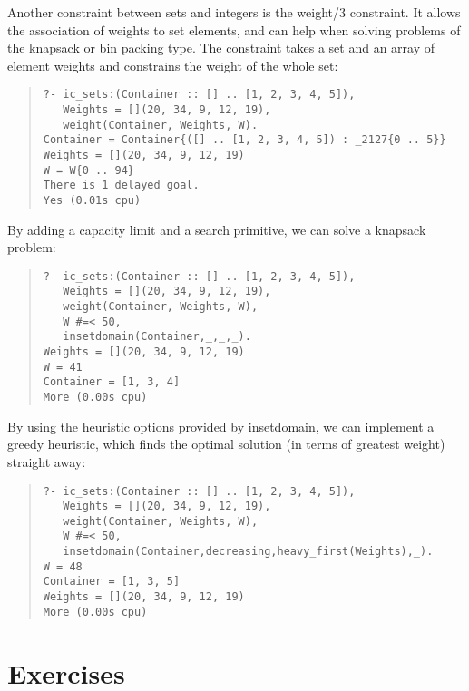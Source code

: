 Another constraint between sets and integers is the weight/3 constraint.
It allows the association of weights to set elements, and can help when
solving problems of the knapsack or bin packing type.
The constraint takes a set and an array of element weights and
constrains the weight of the whole set:
\begin{quote}\begin{verbatim}
?- ic_sets:(Container :: [] .. [1, 2, 3, 4, 5]),
   Weights = [](20, 34, 9, 12, 19),
   weight(Container, Weights, W).
Container = Container{([] .. [1, 2, 3, 4, 5]) : _2127{0 .. 5}}
Weights = [](20, 34, 9, 12, 19)
W = W{0 .. 94}
There is 1 delayed goal.
Yes (0.01s cpu)
\end{verbatim}\end{quote}
By adding a capacity limit and a search primitive, we can solve a
knapsack problem:
\begin{quote}\begin{verbatim}
?- ic_sets:(Container :: [] .. [1, 2, 3, 4, 5]),
   Weights = [](20, 34, 9, 12, 19),
   weight(Container, Weights, W),
   W #=< 50,
   insetdomain(Container,_,_,_).
Weights = [](20, 34, 9, 12, 19)
W = 41
Container = [1, 3, 4]
More (0.00s cpu)
\end{verbatim}\end{quote}

By using the heuristic options provided by insetdomain, we can
implement a greedy heuristic, which finds the optimal solution
(in terms of greatest weight) straight away:
\begin{quote}\begin{verbatim}
?- ic_sets:(Container :: [] .. [1, 2, 3, 4, 5]),
   Weights = [](20, 34, 9, 12, 19),
   weight(Container, Weights, W),
   W #=< 50,
   insetdomain(Container,decreasing,heavy_first(Weights),_).
W = 48
Container = [1, 3, 5]
Weights = [](20, 34, 9, 12, 19)
More (0.00s cpu)
\end{verbatim}\end{quote}


\section{Exercises}

